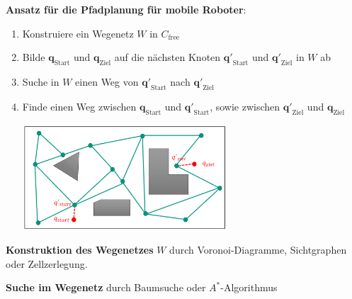 \textbf{Ansatz für die Pfadplanung für mobile Roboter}:
\begin{enumerate}
	\item Konstruiere ein Wegenetz $W$ in $C_\text{free}$
	\item Bilde $\mathbf{q}_\text{Start}$ und $\mathbf{q}_\text{Ziel}$ auf die nächsten Knoten $\mathbf{q'}_\text{Start}$ und $\mathbf{q'}_\text{Ziel}$ in $W$ ab
	\item Suche in $W$ einen Weg von $\mathbf{q'}_\text{Start}$ nach $\mathbf{q'}_\text{Ziel}$
	\item Finde einen Weg zwischen $\mathbf{q}_\text{Start}$ und  $\mathbf{q'}_\text{Start}$, sowie zwischen $\mathbf{q'}_\text{Ziel}$ und $\mathbf{q}_\text{Ziel}$
	\begin{center}
		\includegraphics[width=0.6\textwidth]{images/pfadplanung.png}
	\end{center}
\end{enumerate}

\textbf{Konstruktion des Wegenetzes} $W$ durch Voronoi-Diagramme, Sichtgraphen oder  Zellzerlegung.

\textbf{Suche im Wegenetz} durch Baumsuche oder $A^*$-Algorithmus\\

